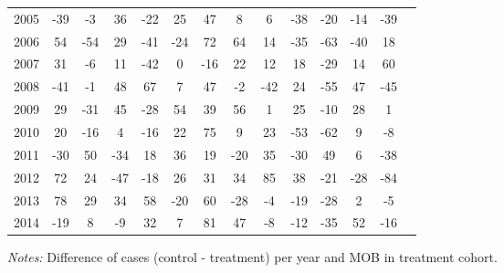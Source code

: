 \begin{table}[H]
\begin{threeparttable}
{\begin{tabular}{l*{13}{c}}
2005        &         -39&          -3&          36&         -22&          25&          47&           8&           6&         -38&         -20&         -14&         -39\\
2006        &          54&         -54&          29&         -41&         -24&          72&          64&          14&         -35&         -63&         -40&          18\\
2007        &          31&          -6&          11&         -42&           0&         -16&          22&          12&          18&         -29&          14&          60\\
2008        &         -41&          -1&          48&          67&           7&          47&          -2&         -42&          24&         -55&          47&         -45\\
2009        &          29&         -31&          45&         -28&          54&          39&          56&           1&          25&         -10&          28&           1\\
2010        &          20&         -16&           4&         -16&          22&          75&           9&          23&         -53&         -62&           9&          -8\\
2011        &         -30&          50&         -34&          18&          36&          19&         -20&          35&         -30&          49&           6&         -38\\
2012        &          72&          24&         -47&         -18&          26&          31&          34&          85&          38&         -21&         -28&         -84\\
2013        &          78&          29&          34&          58&         -20&          60&         -28&          -4&         -19&         -28&           2&          -5\\
2014        &         -19&           8&          -9&          32&           7&          81&          47&          -8&         -12&         -35&          52&         -16\\
 \bottomrule \end{tabular} } \begin{tablenotes} \item \scriptsize \emph{Notes:} Difference of cases (control - treatment) per year and MOB in treatment cohort. \end{tablenotes} \end{threeparttable} \end{table} 
